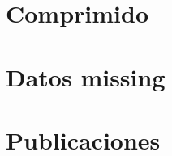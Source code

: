 \section{\Catalogo}
\label{sec:clasificacion:catalogo}










\section{\Catalogo Comprimido}
\label{sec:clasificacion:catalogo-comprimido}










\section{\CC}
\label{sec:clasificacion:catalogo-completo}







\section{Datos missing}
\label{sec:clasificacion:datos-missing}






\section{Publicaciones}
\label{sec:clasificacion:publicaciones}







